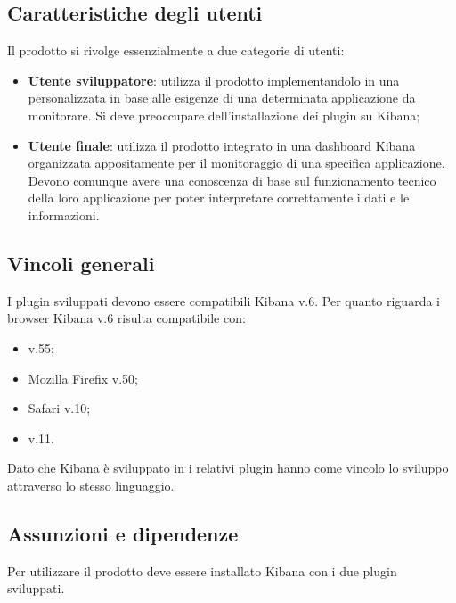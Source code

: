 	\subsection{Caratteristiche degli utenti}
	Il prodotto si rivolge essenzialmente a due categorie di utenti:
	\begin{itemize}
		\item \textbf{Utente sviluppatore}: utilizza il prodotto implementandolo in una  personalizzata in base alle esigenze di una determinata applicazione da monitorare. Si deve preoccupare dell'installazione dei plugin su Kibana;
		\item \textbf{Utente finale}: utilizza il prodotto integrato in una dashboard Kibana organizzata appositamente per il monitoraggio di una specifica applicazione. Devono comunque avere una conoscenza di base sul funzionamento tecnico della loro applicazione per poter interpretare correttamente i dati e le informazioni.
	\end{itemize}
	\subsection{Vincoli generali}
	I plugin sviluppati devono essere compatibili  Kibana v.6.
	Per quanto riguarda i browser Kibana v.6 risulta compatibile con: 
	\begin{itemize}
		\item {} v.55;
		\item Mozilla Firefix v.50;
		\item Safari v.10;
		\item {} v.11.
	\end{itemize}
	Dato che Kibana è sviluppato in  i relativi plugin hanno come vincolo lo sviluppo attraverso lo stesso linguaggio.
	
	\subsection{Assunzioni e dipendenze}
	Per utilizzare il prodotto deve essere installato Kibana con i due plugin sviluppati. 
	
